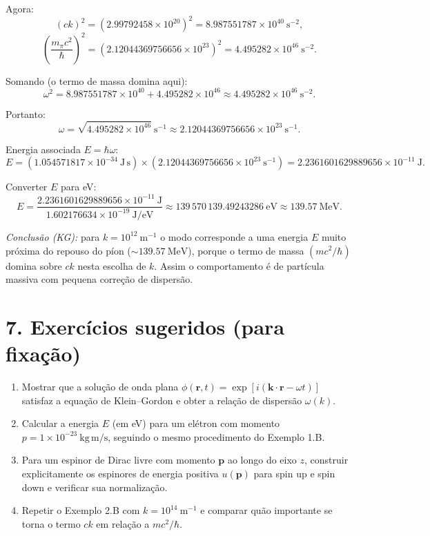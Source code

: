 \documentclass[12pt,a4paper]{article}
\begin{document}
Agora:
\[
(ck)^2 = (2.99792458\times 10^{20})^2 = 8.987551787\times 10^{40}\ \mathrm{s^{-2}},
\]
\[
\left(\frac{m_\pi c^2}{\hbar}\right)^2 = (2.12044369756656\times 10^{23})^2 = 4.495282\!\times 10^{46}\ \mathrm{s^{-2}}.
\]

Somando (o termo de massa domina aqui):
\[
\omega^2 = 8.987551787\times 10^{40} + 4.495282\times 10^{46} \approx 4.495282\times 10^{46}\ \mathrm{s^{-2}}.
\]

Portanto:
\[
\omega = \sqrt{4.495282\times 10^{46}}\ \mathrm{s^{-1}} \approx 2.12044369756656\times 10^{23}\ \mathrm{s^{-1}}.
\]

Energia associada \(E=\hbar\omega\):
\[
E = (1.054571817\times 10^{-34}\ \mathrm{J\,s})\times (2.12044369756656\times 10^{23}\ \mathrm{s^{-1}})
= 2.2361601629889656\times 10^{-11}\ \mathrm{J}.
\]

Converter \(E\) para eV:
\[
E = \frac{2.2361601629889656\times 10^{-11}\ \mathrm{J}}{1.602176634\times 10^{-19}\ \mathrm{J/eV}}
\approx 139\,570\,139.49243286\ \mathrm{eV} \approx 139.57\ \mathrm{MeV}.
\]

\emph{Conclusão (KG):} para \(k=10^{12}\ \mathrm{m^{-1}}\) o modo corresponde a uma energia \(E\) muito próxima do repouso do píon (\(\sim139.57\ \mathrm{MeV}\)), porque o termo de massa \((mc^2/\hbar)\) domina sobre \(ck\) nesta escolha de \(k\). Assim o comportamento é de partícula massiva com pequena correção de dispersão.

\section*{7. Exercícios sugeridos (para fixação)}

\begin{enumerate}
  \item Mostrar que a solução de onda plana \(\phi(\mathbf{r},t)=\exp[i(\mathbf{k}\cdot\mathbf{r}-\omega t)]\) satisfaz a equação de Klein--Gordon e obter a relação de dispersão \(\omega(k)\).
  \item Calcular a energia \(E\) (em eV) para um elétron com momento \(p = 1\times10^{-23}\ \mathrm{kg\,m/s}\), seguindo o mesmo procedimento do Exemplo 1.B.
  \item Para um espinor de Dirac livre com momento \(\mathbf p\) ao longo do eixo \(z\), construir explicitamente os espinores de energia positiva \(u(\mathbf p)\) para spin up e spin down e verificar sua normalização.
  \item Repetir o Exemplo 2.B com \(k=10^{14}\ \mathrm{m^{-1}}\) e comparar quão importante se torna o termo \(ck\) em relação a \(mc^2/\hbar\).
\end{enumerate}
\end{document}
